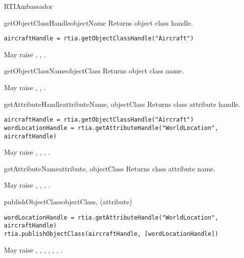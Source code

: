 \begin{classdesc}{RTIAmbassador}{}
\begin{methoddesc}{getObjectClassHandle}{objectName}
Returns object class handle.

\begin{verbatim} 
aircraftHandle = rtia.getObjectClassHandle("Aircraft")
\end{verbatim}

May raise
,
,
.
\end{methoddesc}

\begin{methoddesc}{getObjectClassName}{objectClass}
Returns object class name.

May raise
,
,
.
\end{methoddesc}

\begin{methoddesc}{getAttributeHandle}{attributeName, objectClass}
Returns class attribute handle.

\begin{verbatim} 
aircraftHandle = rtia.getObjectClassHandle("Aircraft")
wordLocationHandle = rtia.getAttributeHandle("WorldLocation", aircraftHandle)
\end{verbatim}

May raise
,
,
,
.
\end{methoddesc}

\begin{methoddesc}{getAttributeName}{attribute, objectClass}
Returns class attribute name.

May raise
,
,
,
.
\end{methoddesc}

\begin{methoddesc}{publishObjectClass}{objectClass, (attribute)}

\begin{verbatim} 
wordLocationHandle = rtia.getAttributeHandle("WorldLocation", aircraftHandle)
rtia.publishObjectClass(aircraftHandle, [wordLocationHandle])
\end{verbatim}

May raise
,
,
,
,
,
,
.
\end{methoddesc}


\end{classdesc}
